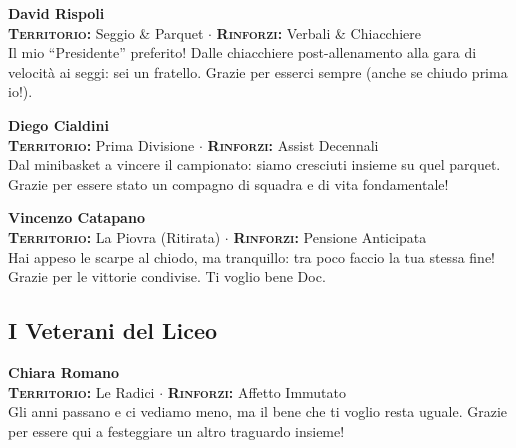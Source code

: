 \noindent\begin{minipage}{\linewidth}
\textbf{David Rispoli} \\
{\footnotesize \textbf{\textsc{Territorio:}} Seggio \& Parquet $\cdot$ \textbf{\textsc{Rinforzi:}} Verbali \& Chiacchiere} \\
Il mio ``Presidente'' preferito! Dalle chiacchiere post-allenamento alla gara di velocità ai seggi: sei un fratello. Grazie per esserci sempre (anche se chiudo prima io!).
\end{minipage}
\vspace{0.6cm}

\noindent\begin{minipage}{\linewidth}
\textbf{Diego Cialdini} \\
{\footnotesize \textbf{\textsc{Territorio:}} Prima Divisione $\cdot$ \textbf{\textsc{Rinforzi:}} Assist Decennali} \\
Dal minibasket a vincere il campionato: siamo cresciuti insieme su quel parquet. Grazie per essere stato un compagno di squadra e di vita fondamentale!
\end{minipage}
\vspace{0.6cm}

\noindent\begin{minipage}{\linewidth}
\textbf{Vincenzo Catapano} \\
{\footnotesize \textbf{\textsc{Territorio:}} La Piovra (Ritirata) $\cdot$ \textbf{\textsc{Rinforzi:}} Pensione Anticipata} \\
Hai appeso le scarpe al chiodo, ma tranquillo: tra poco faccio la tua stessa fine! Grazie per le vittorie condivise. Ti voglio bene Doc.
\end{minipage}

\subsection*{I Veterani del Liceo}

\noindent\begin{minipage}{\linewidth}
\textbf{Chiara Romano} \\
{\footnotesize \textbf{\textsc{Territorio:}} Le Radici $\cdot$ \textbf{\textsc{Rinforzi:}} Affetto Immutato} \\
Gli anni passano e ci vediamo meno, ma il bene che ti voglio resta uguale. Grazie per essere qui a festeggiare un altro traguardo insieme!
\end{minipage}
\vspace{0.6cm}

